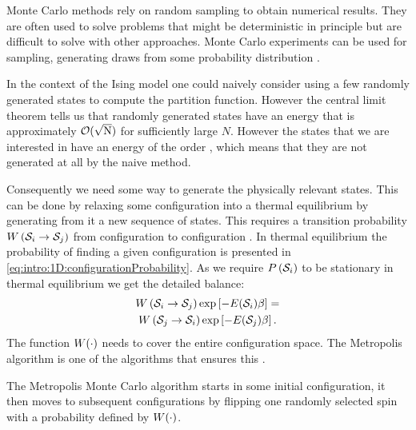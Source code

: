 
Monte Carlo methods rely on random sampling to obtain numerical results. They are often used to solve problems that might be deterministic in principle but are difficult to solve with other approaches. Monte Carlo experiments can be used for sampling, \ie generating draws from some probability distribution \cite{kroese2014monte}. 

In the context of the Ising model one could naively consider using a few randomly generated states to compute the partition function. However the central limit theorem tells us that randomly generated states have an energy that is approximately $\mathcal{O}(\sqrt{\mathrm{N}})$ for sufficiently large $N$. However the states that we are interested in have an energy of the order \bigOh{\numberOfSpins}, which means that they are not generated at all by the naive method. 

Consequently we need some way to generate the physically relevant states. This can be done by relaxing some configuration into a thermal equilibrium by generating from it a new sequence of states. This requires a transition probability $W\left(\mathcal{S}_{i} \to \mathcal{S}_{j} \right)$ from configuration  to configuration . In thermal equilibrium the probability of finding a given configuration is presented in \cref{eq:intro:1D:configurationProbability}. As we require $P\left(\mathcal{S}_{i}\right)$ to be stationary in thermal equilibrium we get the detailed balance:
\begin{multline}\label{eq:intro:mcm:detailedbalance}
	W\left(\mathcal{S}_{i} \to \mathcal{S}_{j}\right)\exp\left[-E(\mathcal{S}_{i})\beta \right] = \\
	W\left(\mathcal{S}_{j} \to \mathcal{S}_{i}\right)\exp\left[-E(\mathcal{S}_{j})\beta \right].
\end{multline}
The function $W(\cdot)$ needs to cover the entire configuration space. The Metropolis algorithm is one of the algorithms that ensures this \cite{kenzel1997physics}. 

The Metropolis Monte Carlo algorithm starts in some initial configuration, it then moves to subsequent configurations by flipping one randomly selected spin with a probability defined by \mbox{$W(\cdot)$}. 